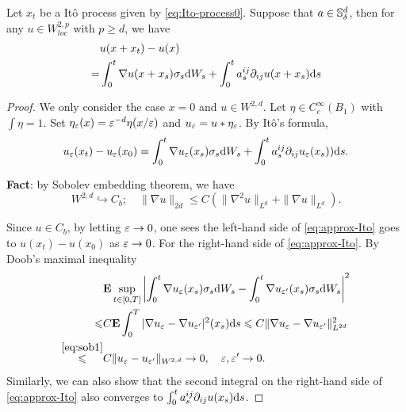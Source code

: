 \begin{theorem}
    Let $x_t$ be a  It\^o process given by \eqref{eq:Ito-process0}. Suppose that $a\in {\mathbb S}^d_\delta$, then for any $u\in W^{2,p}_{loc}$ with $p\geq d$, we have 
    \begin{equation}
        \begin{aligned}
            &u(x+x_t)-u(x)\\
            =&\int_0^t \nabla u(x+x_s)\sigma_s \text{\rm{d}} W_s+ \int_0^t a_s^{ij} \partial_{ij}u(x+x_s) \text{\rm{d}} s 
        \end{aligned}			
    \end{equation}
\end{theorem}
\begin{proof}
    We only consider the case  \(x=0\) and $u\in W^{2,d}$. Let $\eta\in C_c^\infty(B_1)$ with $\int\eta=1$. Set $\eta_\varepsilon(x)=\varepsilon^{-d} \eta(x/\varepsilon)$ and $u_\varepsilon=u*\eta_\varepsilon$. By It\^o's formula, 
		\begin{equation}\label{eq:approx-Ito}
			u_\varepsilon(x_t)-u_\varepsilon(x_0)=\int_0^t \nabla u_\varepsilon (x_s)\sigma_s \text{\rm{d}} W_s+ \int_0^t a_s^{ij} \partial_{ij}u_\varepsilon(x_s) ) \text{\rm{d}} s. 
		\end{equation}
		\begin{framed}
			{\bf Fact}: by Sobolev embedding theorem, we have  
			\begin{equation}\label{eq:sob1}
				W^{2,d}\hookrightarrow C_b; \quad \|\nabla u\|_{2d} \leq C (\|\nabla^2 u\|_{L^d} + \|\nabla u\|_{L^d}) . 
			\end{equation}
		\end{framed}
		Since $u\in C_b$, by letting $\varepsilon\to0$, one sees the left-hand side of \eqref{eq:approx-Ito} goes to $u(x_t)-u(x_0)$ as $\varepsilon\to0$. For the right-hand side of \eqref{eq:approx-Ito}. 
		By Doob's maximal inequality
		\[
		\begin{aligned}
			&{\mathbf E} \sup_{t\in [0,T]} \left|\int_0^t \nabla u_\varepsilon (x_s)\sigma_s \text{\rm{d}} W_s -\int_0^t \nabla u_{\varepsilon'} (x_s)\sigma_s \text{\rm{d}} W_s\right|^2\\
			\leqslant & C {\mathbf E} \int_0^T |\nabla u_\varepsilon- \nabla u_{\varepsilon'}|^2 (x_s) \text{\rm{d}} s \leqslant C \|\nabla u_\varepsilon -\nabla u_{\varepsilon'}\|^2_{L^{2d}}\\
			\overset{\eqref{eq:sob1}}{\leqslant} & C \|u_\varepsilon - u_{\varepsilon'}\|_{W^{2,d}} \to 0, \quad \varepsilon,\varepsilon'\to0. 
		\end{aligned}
		\]
		Similarly, we can also show that the second integral on the right-hand side of \eqref{eq:approx-Ito} also converges to $ \int_0^t a_s^{ij} \partial_{ij}u(x_s)  \text{\rm{d}} s$. 
	\end{proof}

